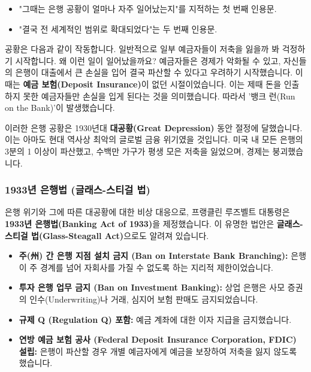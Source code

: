 \documentclass[11pt,a4paper]{book}
\theoremstyle{definition}
\begin{document}
\begin{examplebox}[title={은행 공황에 대한 유명한 인용문}]
\begin{itemize}
    \item "그때는 은행 공황이 얼마나 자주 일어났는지"를 지적하는 첫 번째 인용문.
    \item "결국 전 세계적인 범위로 확대되었다"는 두 번째 인용문.
\end{itemize}
\end{examplebox}

공황은 다음과 같이 작동합니다. 일반적으로 일부 예금자들이 저축을 잃을까 봐 걱정하기 시작합니다. 왜 이런 일이 일어났을까요? 예금자들은 경제가 악화될 수 있고, 자신들의 은행이 대출에서 큰 손실을 입어 결국 파산할 수 있다고 우려하기 시작했습니다. 이때는 \textbf{예금 보험(Deposit Insurance)}이 없던 시절이었습니다. 이는 제때 돈을 인출하지 못한 예금자들만 손실을 입게 된다는 것을 의미했습니다. 따라서 '뱅크 런(Run on the Bank)'이 발생했습니다.

이러한 은행 공황은 1930년대 \textbf{대공황(Great Depression)} 동안 절정에 달했습니다. 이는 아마도 현대 역사상 최악의 글로벌 금융 위기였을 것입니다. 미국 내 모든 은행의 3분의 1 이상이 파산했고, 수백만 가구가 평생 모은 저축을 잃었으며, 경제는 붕괴했습니다.

\subsubsection*{1933년 은행법 (글래스-스티걸 법)}
은행 위기와 그에 따른 대공황에 대한 비상 대응으로, 프랭클린 루즈벨트 대통령은 \textbf{1933년 은행법(Banking Act of 1933)}을 제정했습니다. 이 유명한 법안은 \textbf{글래스-스티걸 법(Glass-Steagall Act)}으로도 알려져 있습니다.

\begin{summarybox}[title={글래스-스티걸 법의 주요 변화}]
\begin{itemize}
    \item \textbf{주(州) 간 은행 지점 설치 금지 (Ban on Interstate Bank Branching):} 은행이 주 경계를 넘어 자회사를 가질 수 없도록 하는 지리적 제한이었습니다.
    \item \textbf{투자 은행 업무 금지 (Ban on Investment Banking):} 상업 은행은 사모 증권의 인수(Underwriting)나 거래, 심지어 보험 판매도 금지되었습니다.
    \item \textbf{규제 Q (Regulation Q) 포함:} 예금 계좌에 대한 이자 지급을 금지했습니다.
    \item \textbf{연방 예금 보험 공사 (Federal Deposit Insurance Corporation, FDIC) 설립:} 은행이 파산할 경우 개별 예금자에게 예금을 보장하여 저축을 잃지 않도록 했습니다.
\end{itemize}
\end{summarybox}
\end{document}
